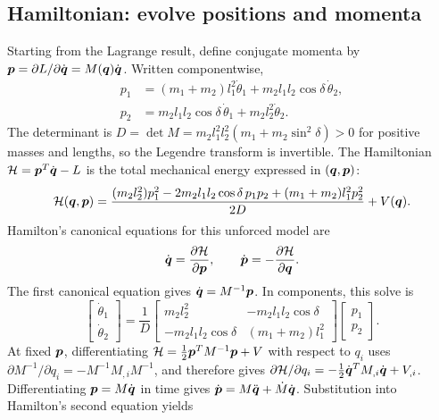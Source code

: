 \documentclass[../main.tex]{subfiles}
\begin{document}
\subsection{Hamiltonian: evolve positions and momenta}

Starting from the Lagrange result, define conjugate momenta by $\boldsymbol{p}=\partial L/\partial\dot{\boldsymbol{q}}=M(\boldsymbol{q})\dot{\boldsymbol{q}}$. Written componentwise,
\begin{equation}
\begin{aligned}
p_1&=(m_1+m_2)l_1^2\dot\theta_1+m_2l_1l_2\cos\delta\,\dot\theta_2,\\
p_2&=m_2l_1l_2\cos\delta\,\dot\theta_1+m_2l_2^2\dot\theta_2.
\end{aligned}
\label{eq:chapter1-double-pendulum-momenta}
\end{equation}
The determinant is $D=\det M=m_2l_1^2l_2^2(m_1+m_2\sin^2\delta)>0$ for positive masses and lengths, so the Legendre transform is invertible. The Hamiltonian $\mathcal H=\boldsymbol{p}^T\dot{\boldsymbol{q}}-L$ is the total mechanical energy expressed in $(\boldsymbol{q},\boldsymbol{p})$:
\begin{equation}
\mathcal{H}(\boldsymbol{q},\boldsymbol{p})
=\frac{(m_2l_2^2)p_1^2-2m_2l_1l_2\cos\delta\,p_1p_2
+(m_1+m_2)l_1^2p_2^2}{2D}+V(\boldsymbol{q}).
\label{eq:chapter1-double-pendulum-hamiltonian}
\end{equation}
Hamilton's canonical equations for this unforced model are
\begin{equation}
\dot{\boldsymbol{q}}=\frac{\partial\mathcal{H}}{\partial\boldsymbol{p}},
\qquad
\dot{\boldsymbol{p}}=-\frac{\partial\mathcal{H}}{\partial\boldsymbol{q}}.
\label{eq:chapter1-hamilton-double-pendulum}
\end{equation}
The first canonical equation gives $\dot{\boldsymbol{q}}=M^{-1}\boldsymbol{p}$. In components, this solve is
\begin{equation}
\begin{bmatrix}\dot\theta_1\\\dot\theta_2\end{bmatrix}
=\frac{1}{D}
\begin{bmatrix}
m_2l_2^2 & -m_2l_1l_2\cos\delta\\
-m_2l_1l_2\cos\delta & (m_1+m_2)l_1^2
\end{bmatrix}
\begin{bmatrix}p_1\\p_2\end{bmatrix}.
\label{eq:chapter1-hamilton-velocity-solve}
\end{equation}
At fixed $\boldsymbol{p}$, differentiating $\mathcal H=\tfrac12\boldsymbol{p}^TM^{-1}\boldsymbol{p}+V$ with respect to $q_i$ uses $\partial M^{-1}/\partial q_i=-M^{-1}M_{,i}M^{-1}$, and therefore gives $\partial\mathcal H/\partial q_i=-\tfrac12\dot{\boldsymbol{q}}^{T}M_{,i}\dot{\boldsymbol{q}}+V_{,i}$. Differentiating $\boldsymbol{p}=M\dot{\boldsymbol{q}}$ in time gives $\dot{\boldsymbol{p}}=M\ddot{\boldsymbol{q}}+\dot M\dot{\boldsymbol{q}}$. Substitution into Hamilton's second equation yields
\end{document}

